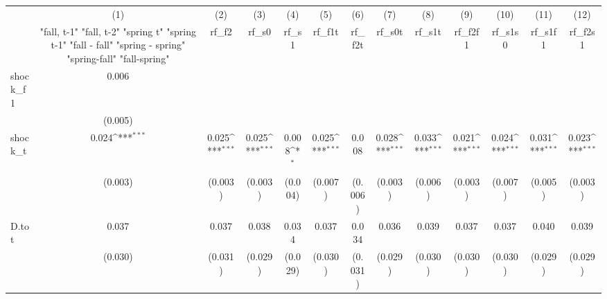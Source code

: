 {
\def\sym#1{\ifmmode^{#1}\else\(^{#1}\)\fi}
\begin{tabular}{l*{12}{c}}
\toprule
            &\multicolumn{1}{c}{(1)}&\multicolumn{1}{c}{(2)}&\multicolumn{1}{c}{(3)}&\multicolumn{1}{c}{(4)}&\multicolumn{1}{c}{(5)}&\multicolumn{1}{c}{(6)}&\multicolumn{1}{c}{(7)}&\multicolumn{1}{c}{(8)}&\multicolumn{1}{c}{(9)}&\multicolumn{1}{c}{(10)}&\multicolumn{1}{c}{(11)}&\multicolumn{1}{c}{(12)}\\
            &\multicolumn{1}{c}{  "fall, t-1" "fall, t-2" "spring t" "spring t-1"  "fall - fall" "spring - spring" "spring-fall" "fall-spring" }&\multicolumn{1}{c}{rf\_f2}&\multicolumn{1}{c}{rf\_s0}&\multicolumn{1}{c}{rf\_s1}&\multicolumn{1}{c}{rf\_f1t}&\multicolumn{1}{c}{rf\_f2t}&\multicolumn{1}{c}{rf\_s0t}&\multicolumn{1}{c}{rf\_s1t}&\multicolumn{1}{c}{rf\_f2f1}&\multicolumn{1}{c}{rf\_s1s0}&\multicolumn{1}{c}{rf\_s1f1}&\multicolumn{1}{c}{rf\_f2s1}\\
\midrule
shock\_f1    &       0.006         &                     &                     &                     &                     &                     &                     &                     &                     &                     &                     &                     \\
            &     (0.005)         &                     &                     &                     &                     &                     &                     &                     &                     &                     &                     &                     \\
\addlinespace
shock\_t     &       0.024\sym{***}&       0.025\sym{***}&       0.025\sym{***}&       0.008\sym{*}  &       0.025\sym{***}&       0.008         &       0.028\sym{***}&       0.033\sym{***}&       0.021\sym{***}&       0.024\sym{***}&       0.031\sym{***}&       0.023\sym{***}\\
            &     (0.003)         &     (0.003)         &     (0.003)         &     (0.004)         &     (0.007)         &     (0.006)         &     (0.003)         &     (0.006)         &     (0.003)         &     (0.007)         &     (0.005)         &     (0.003)         \\
\addlinespace
D.tot       &       0.037         &       0.037         &       0.038         &       0.034         &       0.037         &       0.034         &       0.036         &       0.039         &       0.037         &       0.037         &       0.040         &       0.039         \\
            &     (0.030)         &     (0.031)         &     (0.029)         &     (0.029)         &     (0.030)         &     (0.031)         &     (0.029)         &     (0.030)         &     (0.030)         &     (0.030)         &     (0.029)         &     (0.029)         \\

\end{tabular}}
